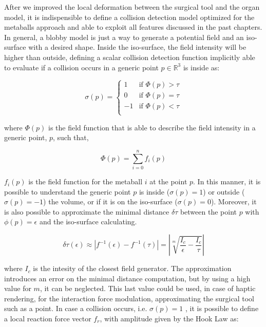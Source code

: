 \documentclass[journal]{vgtc}                %
\begin{document}
After we improved the local deformation between the surgical tool and the organ
model, it is indispensible to define a collision detection model optimized for the
metaballs approach and able to exploit all features discussed in the past chapters. In
general, a blobby model is just a way to generate a potential field and an iso-surface
with a desired shape. Inside the iso-surface, the field intensity will be higher than
outside, defining a scalar collision detection function implicitly able to evaluate if a
collision occurs in a generic point $p \in \mathbb{R}^{3}$ is inside as:

\[
 \sigma(p) = 
  \begin{cases} 
   1    &       \text{if } \Phi (p) > \tau\\
   0    &       \text{if } \Phi (p) = \tau\\
  -1    &       \text{if } \Phi (p) < \tau\\
  \end{cases}
\]

where $\Phi (p)$ is the field function that is able to describe the field intensity in a generic point, $p$, such that,

\begin{equation}
\Phi(p) = \sum_{i=0}^{n} f_{i} (p)
\end{equation}

$f_{i}(p)$ is the field function for the metaball $i$ at the point $p$. In this manner, it is possible to understand the generic point $p$ is inside ($\sigma (p) =1$) or outside ($\sigma (p) = -1$) the volume, or if it is on the iso-surface ($\sigma(p) = 0$). Moreover, it is also possible to approximate the minimal distance $\delta \tau$ between the point $p$ with $\phi(p)= \epsilon$ and the iso-surface calculating.

\begin{equation}
\delta \tau (\epsilon) \approx \left| f^{-1} (\epsilon) - f^{-1}(\tau) \right| = \left| \sqrt[m]{\frac{I_{c}}{\epsilon}-\frac{I_{c}}{\tau}} \right|
\end{equation}

where $I_{c}$ is the intesity of the closest field generator. The approximation
introduces an error on the minimal distance computation, but by using a high value
for $m$, it can be neglected. This last value could be used, in case of haptic rendering,
for the interaction force modulation, approximating the surgical tool such as a point.
In case a collision occurs, i.e. $\sigma(p) = 1$ 
, it is possible to define a local reaction force
vector $f_{r}$, with amplitude given by the Hook Law as:
\end{document}
